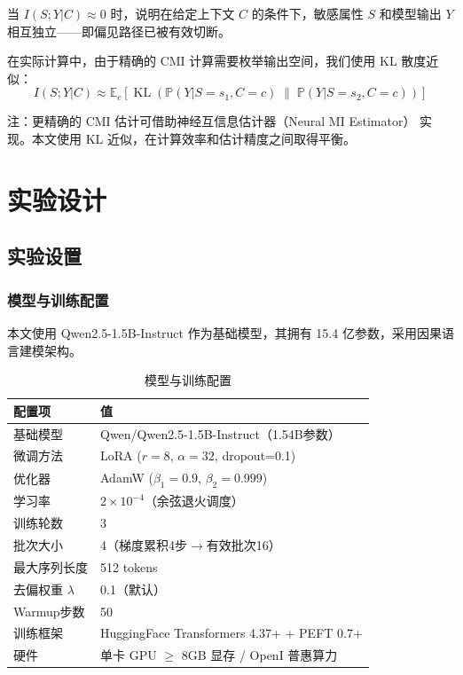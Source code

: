 \documentclass[12pt,a4paper,oneside]{ctexart}
\renewcommand{\P}{\mathbb{P}}
\newcommand{\KL}{\operatorname{KL}}
\begin{document}
当 $I(S; Y | C) \approx 0$ 时，说明在给定上下文 $C$ 的条件下，敏感属性 $S$ 和模型输出 $Y$ 相互独立——即偏见路径已被有效切断。

在实际计算中，由于精确的 CMI 计算需要枚举输出空间，我们使用 KL 散度近似：
\begin{equation}
  I(S; Y | C) \approx \mathbb{E}_{c}\left[ \KL(\P(Y|S=s_1, C=c) \;\|\; \P(Y|S=s_2, C=c)) \right]
  \label{eq:cmi_approx}
\end{equation}

注：更精确的 CMI 估计可借助神经互信息估计器（Neural MI Estimator）\cite{belghazi2018} 实现。本文使用 KL 近似，在计算效率和估计精度之间取得平衡。

\section{实验设计}
\label{sec:experiments}

\subsection{实验设置}

\subsubsection{模型与训练配置}

本文使用 Qwen2.5-1.5B-Instruct\cite{qwen2024} 作为基础模型，其拥有 15.4 亿参数，采用因果语言建模架构。

\begin{table}[H]
  \centering
  \caption{模型与训练配置}
  \label{tab:training_config}
  \begin{tabular}{ll}
    \toprule
    \textbf{配置项} & \textbf{值} \\
    \midrule
    基础模型 & Qwen/Qwen2.5-1.5B-Instruct（1.54B参数） \\
    微调方法 & LoRA ($r=8$, $\alpha=32$, dropout=0.1) \\
    优化器 & AdamW ($\beta_1=0.9$, $\beta_2=0.999$) \\
    学习率 & $2 \times 10^{-4}$（余弦退火调度） \\
    训练轮数 & 3 \\
    批次大小 & 4（梯度累积4步$\to$有效批次16） \\
    最大序列长度 & 512 tokens \\
    去偏权重 $\lambda$ & 0.1（默认） \\
    Warmup步数 & 50 \\
    训练框架 & HuggingFace Transformers 4.37+ + PEFT 0.7+ \\
    硬件 & 单卡 GPU $\geq$ 8GB 显存 / OpenI 普惠算力 \\
    \bottomrule
  \end{tabular}
\end{table}
\end{document}
